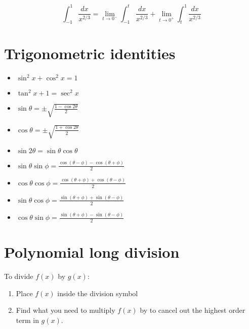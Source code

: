 \documentclass{article}
\begin{document}
\begin{multicols}{2}
\begin{equation*}
\int_{-1}^1 \frac{dx}{x^{2/3}}
=\lim_{t \to 0^-} \int_{-1}^t \frac{dx}{x^{2/3}}
+\lim_{t \to 0^+} \int_{t}^1 \frac{dx}{x^{2/3}}
\end{equation*}

\section*{Trigonometric identities}

{\large
\begin{itemize}

\item
$\sin^2 x + \cos^2 x = 1$

\item
$\tan^2 x + 1 = \sec^2 x$

\item
$\sin \theta = \pm \sqrt{\frac{1-\cos 2\theta}{2}}$

\item
$\cos \theta = \pm \sqrt{\frac{1+\cos 2\theta}{2}}$

\item
$\sin 2\theta = \sin \theta \cos \theta$

\item
$\sin \theta \sin \phi = \frac{ \cos(\theta-\phi)-\cos(\theta+\phi) }{2}$

\item
$\cos \theta \cos \phi = \frac{ \cos(\theta+\phi)+\cos(\theta-\phi) }{2}$

\item
$\sin \theta \cos \phi = \frac{ \sin(\theta+\phi)+\sin(\theta-\phi) }{2}$

\item
$\cos \theta \sin \phi = \frac{ \sin(\theta+\phi)-\sin(\theta-\phi) }{2}$

\end{itemize}
}

\section*{Polynomial long division}

To divide $f(x)$ by $g(x)$:

\begin{enumerate}

\item
Place $f(x)$ inside the division symbol

\item
Find what you need to multiply $f(x)$ by to cancel out the
highest order term in $g(x)$.


\end{enumerate}
\end{multicols}
\end{document}
